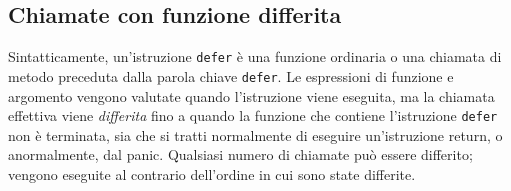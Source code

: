 \documentclass[../../thesis.tex]{subfiles}
\begin{document}
    \subsection{Chiamate con funzione differita}\label{subsec:chiamate-con-funzione-differita}
    Sintatticamente, un'istruzione \verb"defer" è una funzione ordinaria o una chiamata di metodo preceduta dalla parola chiave \verb"defer".
    Le espressioni di funzione e argomento vengono valutate quando l'istruzione viene eseguita, ma la chiamata effettiva viene \textit{differita} fino a quando la funzione che contiene l'istruzione \verb"defer" non è terminata, sia che si tratti normalmente di eseguire un'istruzione return, o anormalmente, dal panic.
    Qualsiasi numero di chiamate può essere differito;
    vengono eseguite al contrario dell'ordine in cui sono state differite.
    \hfill \vspace{12pt}
\end{document}
